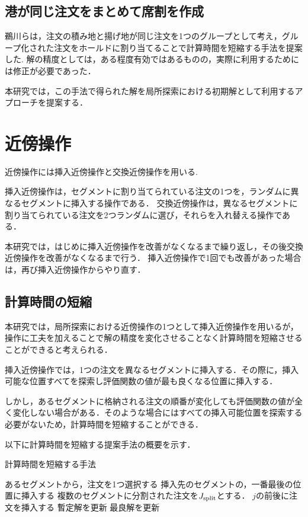 \subsection{港が同じ注文をまとめて席割を作成}
\label{model2}
鵜川らは，注文の積み地と揚げ地が同じ注文を1つのグループとして考え，グループ化された注文をホールドに割り当てることで計算時間を短縮する手法を提案した\cite{ukawa}.
解の精度としては，ある程度有効ではあるものの，実際に利用するためには修正が必要であった．

本研究では，この手法で得られた解を局所探索における初期解として利用するアプローチを提案する．


\section{近傍操作}
近傍操作には挿入近傍操作と交換近傍操作を用いる.

挿入近傍操作は，セグメントに割り当てられている注文の1つを，ランダムに異なるセグメントに挿入する操作である．
交換近傍操作は，異なるセグメントに割り当てられている注文を2つランダムに選び，それらを入れ替える操作である．

本研究では，はじめに挿入近傍操作を改善がなくなるまで繰り返し，その後交換近傍操作を改善がなくなるまで行う．
挿入近傍操作で1回でも改善があった場合は，再び挿入近傍操作からやり直す．


\subsection{計算時間の短縮}
\label{近傍操作の計算時間短縮}
本研究では，局所探索における近傍操作の1つとして挿入近傍操作を用いるが，操作に工夫を加えることで解の精度を変化させることなく計算時間を短縮させることができると考えられる．

挿入近傍操作では，1つの注文を異なるセグメントに挿入する．その際に，挿入可能な位置すべてを探索し評価関数の値が最も良くなる位置に挿入する．

しかし，あるセグメントに格納される注文の順番が変化しても評価関数の値が全く変化しない場合がある．そのような場合にはすべての挿入可能位置を探索する必要がないため，計算時間を短縮することができる．

以下に計算時間を短縮する提案手法の概要を示す．

\begin{algorithm}
 \caption{計算時間を短縮する手法}
 \label{algo1}
 \begin{algorithmic}[1]%
  \STATE あるセグメントから，注文を1つ選択する
  \STATE 挿入先のセグメントの，一番最後の位置に挿入する
  \STATE 複数のセグメントに分割された注文を$J_{\rm split}$とする．
  \STATE $j$の前後に注文を挿入する
  \STATE 暫定解を更新
  \ENDIF
  \ENDFOR
  \STATE 最良解を更新
  \ENDIF
 \end{algorithmic}
\end{algorithm}
